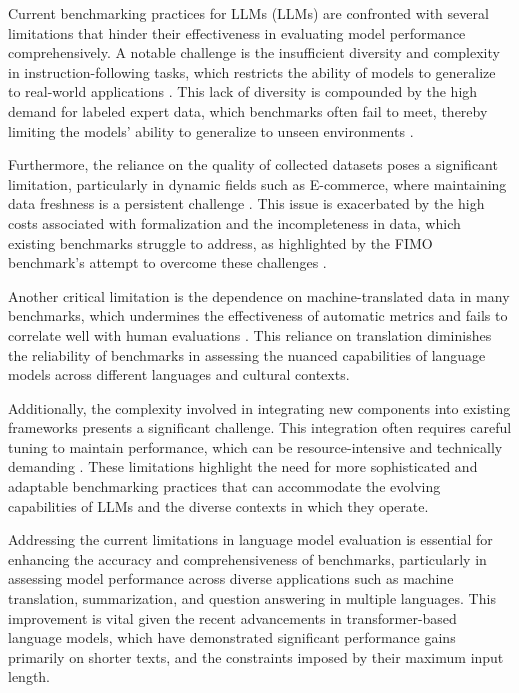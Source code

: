 Current benchmarking practices for LLMs (LLMs) are confronted with several limitations that hinder their effectiveness in evaluating model performance comprehensively. A notable challenge is the insufficient diversity and complexity in instruction-following tasks, which restricts the ability of models to generalize to real-world applications \cite{liu2024visual}. This lack of diversity is compounded by the high demand for labeled expert data, which benchmarks often fail to meet, thereby limiting the models' ability to generalize to unseen environments \cite{zhou2024languageconditionedimitationlearningbase}.



Furthermore, the reliance on the quality of collected datasets poses a significant limitation, particularly in dynamic fields such as E-commerce, where maintaining data freshness is a persistent challenge \cite{li2023ecomgptinstructiontuninglargelanguage}. This issue is exacerbated by the high costs associated with formalization and the incompleteness in data, which existing benchmarks struggle to address, as highlighted by the FIMO benchmark's attempt to overcome these challenges \cite{liu2023fimochallengeformaldataset}.



Another critical limitation is the dependence on machine-translated data in many benchmarks, which undermines the effectiveness of automatic metrics and fails to correlate well with human evaluations \cite{thapliyal2022crossmodal3600massivelymultilingualmultimodal}. This reliance on translation diminishes the reliability of benchmarks in assessing the nuanced capabilities of language models across different languages and cultural contexts.



Additionally, the complexity involved in integrating new components into existing frameworks presents a significant challenge. This integration often requires careful tuning to maintain performance, which can be resource-intensive and technically demanding \cite{lin2023interpretabilityframeworksimilarcase}. These limitations highlight the need for more sophisticated and adaptable benchmarking practices that can accommodate the evolving capabilities of LLMs and the diverse contexts in which they operate.



Addressing the current limitations in language model evaluation is essential for enhancing the accuracy and comprehensiveness of benchmarks, particularly in assessing model performance across diverse applications such as machine translation, summarization, and question answering in multiple languages. This improvement is vital given the recent advancements in transformer-based language models, which have demonstrated significant performance gains primarily on shorter texts, and the constraints imposed by their maximum input length. \cite{ginzburg2021selfsuperviseddocumentsimilarityranking,chowdhery2023palm}



